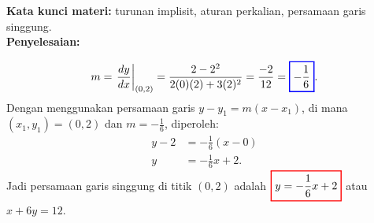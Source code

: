 \documentclass[10pt,openany,a4paper]{article}
\theoremstyle{definition}
\theoremstyle{definition}
\theoremstyle{plain}
\newenvironment{jawab}[2][tes]{%
\par\noindent\textbf{Kata kunci materi:} #1.\\
\textbf{Penyelesaian:} #2%
}{}
\begin{document}
\begin{enumerate}
\begin{jawab}[turunan implisit, aturan perkalian, persamaan garis singgung]
{\begin{enumerate}
            \begin{align*}
                m=\left.\frac{dy}{dx}\right|_{(0,2)} = \frac{2 - 2^2}{2(0)(2) + 3(2)^2}= \frac{-2}{12}= \colorlet{oldcolor}{.}
        \color{blue}
        \setlength{\fboxrule}{1pt} \boxed{\color{oldcolor}-\frac{1}{6}}\color{oldcolor}.
            \end{align*}
            Dengan menggunakan persamaan garis $y - y_1 = m(x - x_1)$, di mana $(x_1,y_1)=(0,2)$ dan $m=-\frac{1}{6}$, diperoleh:
            \begin{align*}
                y - 2 &= -\frac{1}{6}(x - 0)\\
                y &= -\frac{1}{6}x + 2.
            \end{align*}
            Jadi persamaan garis singgung di titik $(0,2)$ adalah $\colorlet{oldcolor}{.}
        \color{red}
        \setlength{\fboxrule}{1pt} \boxed{\color{oldcolor}y = -\frac{1}{6}x + 2}\color{oldcolor}$ atau $x+6y=12$.
        \end{enumerate}
    }
    \end{jawab}
\end{enumerate}

\newpage
\end{document}
